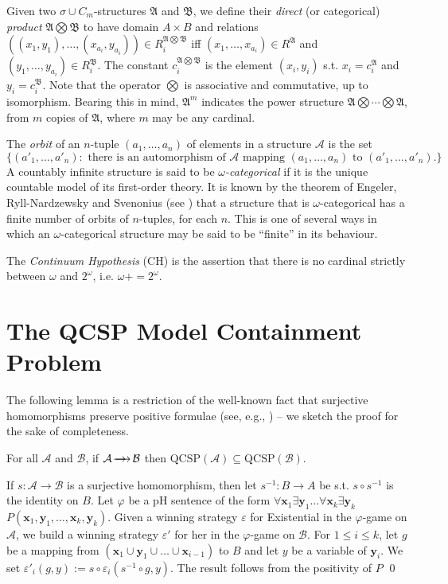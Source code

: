 \documentclass{LMCS}
\newcommand{\tuple}[1]{\ensuremath{\mathbf{#1}}}
\newcommand{\surhom}{
  \ensuremath{
      \negthinspace 
      \longrightarrow
      \hspace{-5mm} \rightarrow \hspace{1mm}
  }
}
\begin{document}
Given two $\sigma \cup C_m$-structures $\mathfrak{A}$ and $\mathfrak{B}$, we define their \emph{direct} (or categorical) \emph{product} $\mathfrak{A} \bigotimes \mathfrak{B}$ to have domain $A \times B$ and relations
$((x_1,y_1),\ldots,(x_{a_i},y_{a_i})) \in R_i^{\mathfrak{A} \bigotimes \mathfrak{B}}$ iff $(x_1,\ldots,x_{a_i}) \in R^\mathfrak{A}$ and $(y_1,\ldots,y_{a_i}) \in R_i^\mathfrak{B}$. The constant $c_i^{\mathfrak{A} \bigotimes \mathfrak{B}}$ is the element $(x_i,y_i)$ s.t. $x_i=c_i^ \mathfrak{A}$ and $y_i=c_i^\mathfrak{B}$. Note that the operator $\bigotimes$ is associative and commutative, up to isomorphism. Bearing this in mind, $\mathfrak{A}^m$ indicates the power structure $\mathfrak{A} \bigotimes \cdots \bigotimes \mathfrak{A}$, from $m$ copies of $\mathfrak{A}$, where $m$ may be any cardinal.

The \emph{orbit} of an $n$-tuple $(a_1,\ldots,a_n)$ of elements in a structure $\mathcal{A}$ is the set 
\[ \{ (a'_1,\ldots,a'_n) : \mbox{ there is an automorphism of $\mathcal{A}$ mapping $(a_1,\ldots,a_n)$ to $(a'_1,\ldots,a'_n)$.} \}\]
A countably infinite structure is said to be \emph{$\omega$-categorical} if it is the unique countable model of its first-order theory. It is known by the theorem of Engeler, Ryll-Nardzewsky and Svenonius (see \cite{Hodges}) that a structure that is $\omega$-categorical has a finite number of orbits of $n$-tuples, for each $n$. This is one of several ways in which an $\omega$-categorical structure may be said to be ``finite'' in its behaviour.

The \emph{Continuum Hypothesis} (CH) is the assertion that there is no cardinal strictly between $\omega$ and $2^\omega$, i.e. $\omega+=2^\omega$.

\section{The QCSP Model Containment Problem}
\label{sec:RHS}


The following lemma is a restriction of the well-known fact that surjective homomorphisms preserve positive formulae (see, e.g., \cite{Hodges}) -- we sketch the proof for the sake of completeness.
\begin{lem}\label{RHS:lem:pos-pres}
For all $\mathcal{A}$ and $\mathcal{B}$, if $\mathcal{A} \surhom \mathcal{B}$ then $\mathrm{QCSP}(\mathcal{A})  \subseteq \mathrm{QCSP}(\mathcal{B})$.
\end{lem}
\proof[(Sketch)]
If $s:\mathcal{A} \rightarrow \mathcal{B}$ is a surjective homomorphism, then let $s^{-1}:B \rightarrow A$ be s.t. $s \circ s^{-1}$ is the identity on $B$. Let $\varphi$ be a pH sentence of the form $\forall \tuple{x}_1 \exists \tuple{y}_1 \ldots \forall \tuple{x}_k \exists \tuple{y}_k $ $P(\tuple{x}_1,\tuple{y}_1,\ldots,\tuple{x}_k,\tuple{y}_k)$. Given a winning strategy $\varepsilon$ for Existential in the $\varphi$-game on $\mathcal{A}$, we build a winning strategy $\varepsilon'$ for her in the $\varphi$-game on $\mathcal{B}$. For $1 \leq i \leq k$, let $g$ be a mapping from $(\tuple{x}_1 \cup \tuple{y}_1 \cup \ldots \cup \tuple{x}_{i-1})$ to $B$ and let $y$ be a variable of $\tuple{y}_i$. We set $\varepsilon'_i(g,y):= s \circ \varepsilon_i( s^{-1} \circ g, y )$. The result follows from the positivity of $P$
\qed
\end{document}
